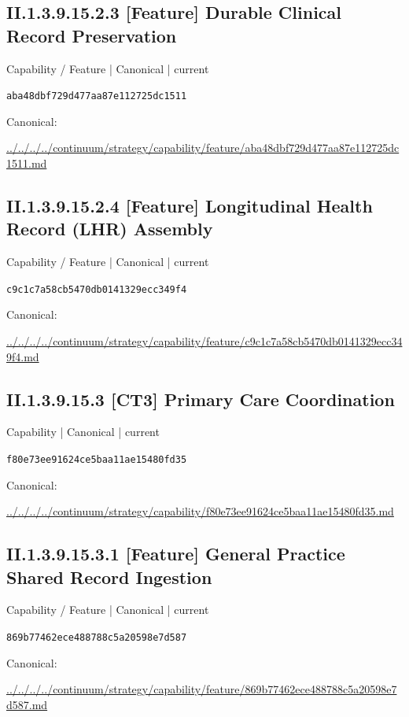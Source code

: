\documentclass[10pt,a4paper]{article}
\begin{document}
\subsection*{II.1.3.9.15.2.3 [Feature] Durable Clinical Record Preservation}
\label{element-aba48dbf729d477aa87e112725dc1511}
{\small Capability / Feature | Canonical | current}\par
\texttt{aba48dbf729d477aa87e112725dc1511}\par
Canonical: \par
{\footnotesize\url{../../../../continuum/strategy/capability/feature/aba48dbf729d477aa87e112725dc1511.md}}\par
\subsection*{II.1.3.9.15.2.4 [Feature] Longitudinal Health Record (LHR) Assembly}
\label{element-c9c1c7a58cb5470db0141329ecc349f4}
{\small Capability / Feature | Canonical | current}\par
\texttt{c9c1c7a58cb5470db0141329ecc349f4}\par
Canonical: \par
{\footnotesize\url{../../../../continuum/strategy/capability/feature/c9c1c7a58cb5470db0141329ecc349f4.md}}\par
\subsection*{II.1.3.9.15.3 [CT3] Primary Care Coordination}
\label{element-f80e73ee91624ce5baa11ae15480fd35}
{\small Capability | Canonical | current}\par
\texttt{f80e73ee91624ce5baa11ae15480fd35}\par
Canonical: \par
{\footnotesize\url{../../../../continuum/strategy/capability/f80e73ee91624ce5baa11ae15480fd35.md}}\par
\subsection*{II.1.3.9.15.3.1 [Feature] General Practice Shared Record Ingestion}
\label{element-869b77462ece488788c5a20598e7d587}
{\small Capability / Feature | Canonical | current}\par
\texttt{869b77462ece488788c5a20598e7d587}\par
Canonical: \par
{\footnotesize\url{../../../../continuum/strategy/capability/feature/869b77462ece488788c5a20598e7d587.md}}\par
\end{document}
